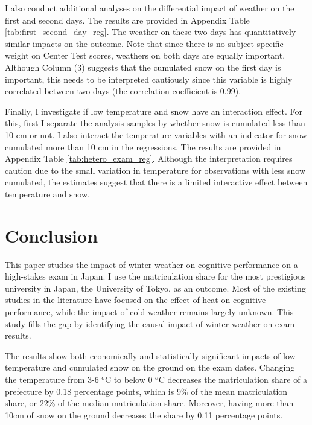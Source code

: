 \documentclass[12pt,letterpaper]{article}
\begin{document}
I also conduct additional analyses on the differential impact of weather on the first and second days.
The results are provided in Appendix Table \ref{tab:first_second_day_reg}.
The weather on these two days has quantitatively similar impacts on the outcome.
Note that since there is no subject-specific weight on Center Test scores, weathers on both days are equally important.
Although Column (3) suggests that the cumulated snow on the first day is important, this needs to be interpreted cautiously since this variable is highly correlated between two days (the correlation coefficient is 0.99).

Finally, I investigate if low temperature and snow have an interaction effect.
For this, first I separate the analysis samples by whether snow is cumulated less than 10 cm or not.
I also interact the temperature variables with an indicator for snow cumulated more than 10 cm in the regressions.
The results are provided in Appendix Table \ref{tab:hetero_exam_reg}.
Although the interpretation requires caution due to the small variation in temperature for observations with less snow cumulated, the estimates suggest that there is a limited interactive effect between temperature and snow.

\section{Conclusion}\label{sec:conclusion}

This paper studies the impact of winter weather on cognitive performance on a high-stakes exam in Japan.
I use the matriculation share for the most prestigious university in Japan, the University of Tokyo, as an outcome.
Most of the existing studies in the literature have focused on the effect of heat on cognitive performance, while the impact of cold weather remains largely unknown.
This study fills the gap by identifying the causal impact of winter weather on exam results.

The results show both economically and statistically significant impacts of low temperature and cumulated snow on the ground on the exam dates.
Changing the temperature from 3-6 $^o$C to below 0 $^o$C decreases the matriculation share of a prefecture by 0.18 percentage points, which is 9\% of the mean matriculation share, or 22\% of the median matriculation share.
Moreover, having more than 10cm of snow on the ground decreases the share by 0.11 percentage points.
\end{document}

